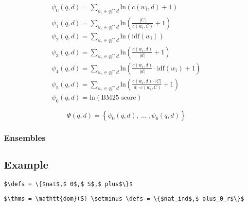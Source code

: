 \begin{definition}
  \[
  \begin{array}{l}
    \psi_0(q, d) = \sum_{w_i \in q \bigcap d} \text{ln}(c(w_i, d) + 1) \\
    \psi_1(q, d) = \sum_{w_i \in q \bigcap d} \text{ln}(\frac{|C|}{c(w_i, C)} + 1) \\
    \psi_2(q, d) = \sum_{w_i \in q \bigcap d} \text{ln}(\text{idf}(w_i)) \\
    \psi_3(q, d) = \sum_{w_i \in q \bigcap d} \text{ln}(\frac{c(w_i, d)}{|d|} + 1) \\
    \psi_4(q, d) = \sum_{w_i \in q \bigcap d} \text{ln}(\frac{c(w_i, d)}{|d|} \cdot \text{idf}(w_i) + 1) \\
    \psi_5(q, d) = \sum_{w_i \in q \bigcap d} \text{ln}(\frac{c(w_i, d) \cdot |C|}{|d| \cdot c(w_i, C)} + 1) \\
    \psi_6(q, d) = \text{ln}( \text{BM25 score} )
  \end{array}
  \]

  \[
    \Psi(q, d) = \left\{ \psi_0(q, d), ~\ldots~, \psi_6(q, d) \right\}
  \]
\end{definition}

\subsubsection{Ensembles}

\subsection{Example}

\begin{lstlisting}[language=Coq, mathescape, frame=none]
$\defs = \{$nat$,$ 0$,$ S$,$ plus$\}$
\end{lstlisting}

\begin{lstlisting}[language=Coq, mathescape, frame=none]
$\thms = \mathtt{dom}(S) \setminus \defs = \{$nat_ind$,$ plus_0_r$\}$
\end{lstlisting}
